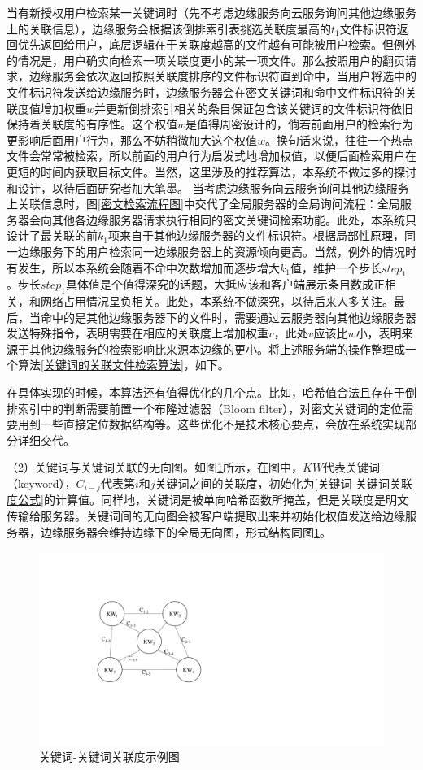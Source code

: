 \documentclass[promaster]{thesis-uestc}
\begin{document}
当有新授权用户检索某一关键词时（先不考虑边缘服务向云服务询问其他边缘服务上的关联信息），边缘服务会根据该倒排索引表挑选关联度最高的$t_1$文件标识符返回优先返回给用户，底层逻辑在于关联度越高的文件越有可能被用户检索。但例外的情况是，用户确实向检索一项关联度更小的某一项文件。那么按照用户的翻页请求，边缘服务会依次返回按照关联度排序的文件标识符直到命中，当用户将选中的文件标识符发送给边缘服务时，边缘服务器会在密文关键词和命中文件标识符的关联度值增加权重$w$并更新倒排索引相关的条目保证包含该关键词的文件标识符依旧保持着关联度的有序性。这个权值$w$是值得周密设计的，倘若前面用户的检索行为更影响后面用户行为，那么不妨稍微加大这个权值$w$。换句话来说，往往一个热点文件会常常被检索，所以前面的用户行为启发式地增加权值，以便后面检索用户在更短的时间内获取目标文件。当然，这里涉及的推荐算法，本系统不做过多的探讨和设计，以待后面研究者加大笔墨。
当考虑边缘服务向云服务询问其他边缘服务上关联信息时，图\ref{密文检索流程图}中交代了全局服务器的全局询问流程：全局服务器会向其他各边缘服务器请求执行相同的密文关键词检索功能。此处，本系统只设计了最关联的前$k_1$项来自于其他边缘服务器的文件标识符。根据局部性原理，同一边缘服务下的用户检索同一边缘服务器上的资源倾向更高。当然，例外的情况时有发生，所以本系统会随着不命中次数增加而逐步增大$k_1$值，维护一个步长$step_1$。步长$step_1$具体值是个值得深究的话题，大抵应该和客户端展示条目数成正相关，和网络占用情况呈负相关。此处，本系统不做深究，以待后来人多关注。最后，当命中的是其他边缘服务器下的文件时，需要通过云服务器向其他边缘服务器发送特殊指令，表明需要在相应的关联度上增加权重$v$，此处$v$应该比$w$小，表明来源于其他边缘服务的检索影响比来源本边缘的更小。将上述服务端的操作整理成一个算法\ref{关键词的关联文件检索算法}，如下。

在具体实现的时候，本算法还有值得优化的几个点。比如，哈希值合法且存在于倒排索引中的判断需要前置一个布隆过滤器（Bloom filter），对密文关键词的定位需要用到一些直接定位数据结构等。这些优化不是技术核心要点，会放在系统实现部分详细交代。

（2）关键词与关键词关联的无向图。如图\ref{关键词-关键词关联度示例图}所示，在图中，$KW$代表关键词（keyword），$C_{i-j}$代表第$i$和$j$关键词之间的关联度，初始化为\ref{关键词-关键词关联度公式}的计算值。同样地，关键词是被单向哈希函数所掩盖，但是关联度是明文传输给服务器。关键词间的无向图会被客户端提取出来并初始化权值发送给边缘服务器，边缘服务器会维持边缘下的全局无向图，形式结构同图\ref{关键词-关键词关联度示例图}。
\begin{figure}[htbp]
    \centering
    \includegraphics[width = 0.6\linewidth]{pic/关键词关联度示例图.pdf}
    \caption{关键词-关键词关联度示例图}
    \label{关键词-关键词关联度示例图}
\end{figure}
\end{document}
